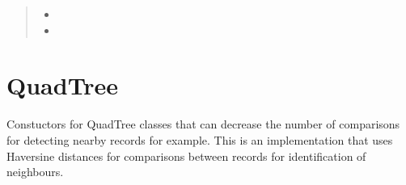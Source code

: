 \documentclass[letterpaper,10pt,english]{sphinxmanual}
\begin{document}
\begin{fulllineitems}
\begin{quote}
\begin{description}
\sphinxAtStartPar
\begin{itemize}
\item {} 
\sphinxAtStartPar
{}

\item {} 
\sphinxAtStartPar
{}

\end{itemize}


\end{description}\end{quote}

\end{fulllineitems}


\section{QuadTree}
\label{\detokenize{users_guide:quadtree}}\label{\detokenize{users_guide:module-GeoSpatialTools.quadtree}}
\sphinxAtStartPar
Constuctors for QuadTree classes that can decrease the number of comparisons
for detecting nearby records for example. This is an implementation that uses
Haversine distances for comparisons between records for identification of
neighbours.
\end{document}
